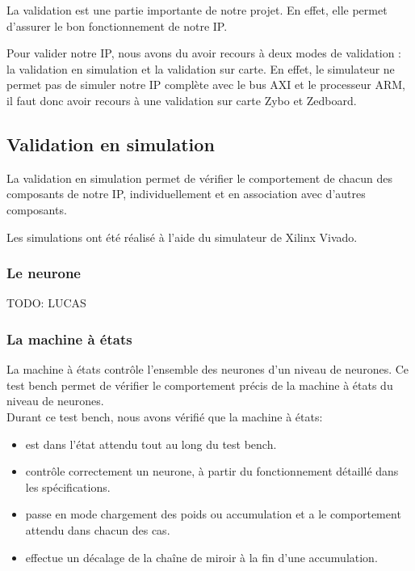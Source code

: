 
La validation est une partie importante de notre projet. En effet, elle permet
d'assurer le bon fonctionnement de notre IP.

Pour valider notre IP, nous avons du avoir recours à deux modes de validation :
la validation en simulation et la validation sur carte.
En effet, le simulateur ne permet pas de simuler notre IP complète avec le bus
AXI et le processeur ARM, il faut donc avoir recours à une validation sur carte
Zybo et Zedboard.

\subsection{Validation en simulation}

La validation en simulation permet de vérifier le comportement de chacun des
composants de notre IP, individuellement et en association avec d'autres
composants.

Les simulations ont été réalisé à l'aide du simulateur de Xilinx Vivado.

\subsubsection{Le neurone}

TODO: LUCAS

\subsubsection{La machine à états}

La machine à états contrôle l'ensemble des neurones d'un niveau de neurones.
Ce test bench permet de vérifier le comportement précis de la machine
à états du niveau de neurones.\\

Durant ce test bench, nous avons vérifié que la machine à états:
\begin{itemize}
	\item est dans l'état attendu tout au long du test bench.
	\item contrôle correctement un neurone, à partir du fonctionnement
	détaillé dans les spécifications.
	\item passe en mode chargement des poids ou accumulation et a le
	comportement attendu dans chacun des cas.
	\item effectue un décalage de la chaîne de miroir à la fin d'une
	accumulation.
\end{itemize}

